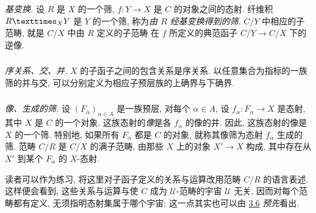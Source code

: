 \subsubsection{}
\emph{基变换.} 设 $R$ 是 $X$ 的一个筛,
$f:Y\rightarrow X$ 是 $C$ 的对象之间的态射.
纤维积 $\fprod{R}{Y}{X}$ 是 $Y$ 的一个筛,
称为\emph{由 $R$ 经基变换得到的筛}.
$C/Y$ 中相应的子范畴, 就是 $C/X$ 中由 $R$ 定义的子范畴
在 $f$ 所定义的典范函子 $C/Y\rightarrow C/X$ 下的逆像.

\subsubsection{}
\emph{序关系、交、并.} $X$ 的子函子之间的包含关系是序关系.
以任意集合为指标的一族筛的并与交,
可以分别定义为相应子预层族的上确界与下确界.

\subsubsection{}
\emph{像、生成的筛.}\pageoriginale
设 $(F_\alpha)_{\alpha\in A}$ 是一族预层,
对每个 $\alpha\in A$, 设 $f_\alpha:F_\alpha\rightarrow X$ 是态射,
其中 $X$ 是 $C$ 的一个对象.
这族态射的\emph{像}是各 $f_\alpha$ 的像的并.
因此, 这族态射的像是 $X$ 的一个筛.
特别地, 如果所有 $F_\alpha$ 都是 $C$ 的对象,
就称其像筛为态射 $f_\alpha$ 生成的筛.
范畴 $C/R$ 是 $C/X$ 的满子范畴,
由那些 $X$ 上的对象 $X'\rightarrow X$ 构成,
其中存在从 $X'$ 到某个 $F_{\alpha}$ 的 $X$-态射.

读者可以作为练习, 将这里对子函子定义的关系与运算改用范畴 $C/R$ 的语言表述.
这样便会看到, 这些关系与运算与使 $C$ 成为 $𝒰$-范畴的宇宙 $𝒰$ 无关,
因而对每个范畴都有定义, 无须指明态射集属于哪个宇宙;
这一点其实也可以由 \hyperref[I.prop3.6]{3.6} \textit{预先}看出.



